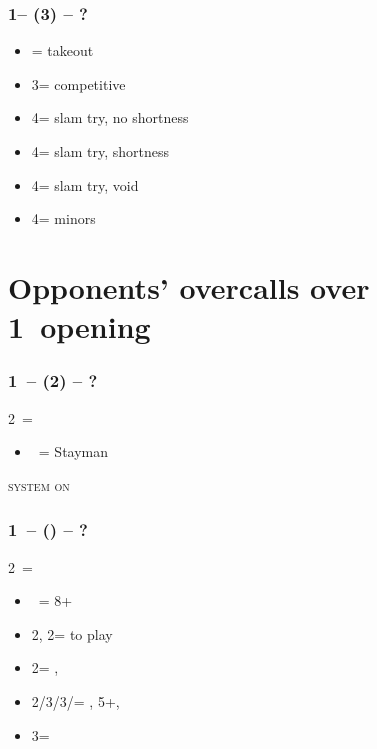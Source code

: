 \documentclass[12pt, a4paper]{report}
\begin{document}
{{{            \subsubsection*{1\spades -- (3\hearts) -- ?}
            \begin{itemize}
                \item \dbl = takeout
                \item 3\spades = competitive
                \item 4\clubs = slam try, no \diams shortness
                \item 4\diams = slam try, \diams shortness
                \item 4\hearts = slam try, \hearts void
                \item 4\nt = minors
            \end{itemize}

        }

        \section*{\colorbox{blue!30}{Opponents' overcalls over 1\ntx\ opening}}
         {

            \subsubsection*{1\ntx\ -- (2\clubs) -- ?}
            2\clubs\ = \clubs
            \begin{itemize}
                \item \dbl\ = Stayman
            \end{itemize}

            \textsc{system on}

            \subsubsection*{1\ntx\ -- (\alrts{2\clubs}) -- ?}
            2\clubs\ = \major
            \begin{itemize}
                \item \dbl\ = 8+
                \item 2\diams, 2\hearts = to play
                \item 2\spades = \minor, \invp
                \item 2\nt/3\clubs/3\diams/\3\hearts = \trsf{\clubs/\diams/\hearts/\spades}, 5+, \invp
                \item 3\spades = \gf
            \end{itemize}

}}}
\end{document}
